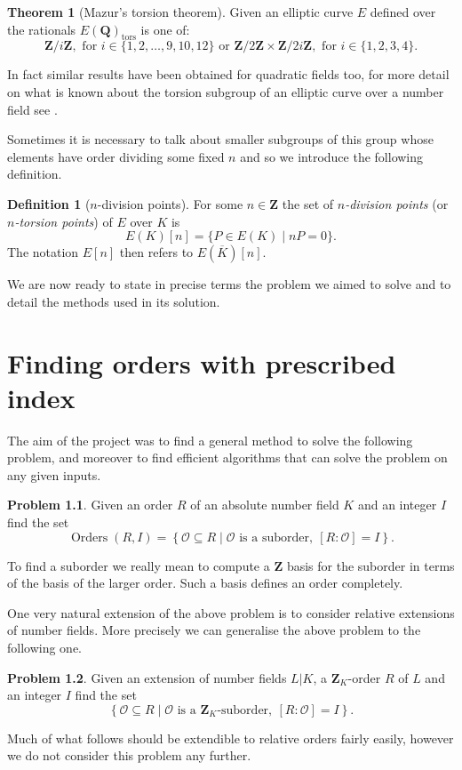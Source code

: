 \documentclass[12pt,a4paper,abstracton,bibtotoc]{scrreprt}
\theoremstyle{definition}
\newtheorem{thm}{Theorem}
\newtheorem{defn}{Definition}
\newtheorem{prob}{Problem}
\newcommand{\QQ}{\mathbf{Q}}
\newcommand{\ZZ}{\mathbf{Z}}
\renewcommand{\O}{\mathcal{O}}
\DeclareMathOperator{\Orders}{Orders}
\begin{document}
\begin{thm}[Mazur's torsion theorem]
\label{thm:tors}
Given an elliptic curve $E$ defined over the rationals $E(\QQ)_\text{tors}$ is one of:
\[
\ZZ/i\ZZ,\text{ for } i \in\{1,2,\ldots,9,10,12\}\text{ or }
\ZZ/2\ZZ \times \ZZ/2i\ZZ,\text{ for } i \in\{1,2,3,4\}.
\]
\end{thm}

In fact similar results have been obtained for quadratic fields too, for more detail on what is known about the torsion subgroup of an elliptic curve over a number field see \cite{sutherland}.

Sometimes it is necessary to talk about smaller subgroups of this group whose elements have order dividing some fixed $n$ and so we introduce the following definition.
\begin{defn}[$n$-division points]
For some $n\in\ZZ$ the set of \emph{$n$-division points} (or \emph{$n$-torsion points}) of $E$ over $K$ is
\[
E(K)[n] = \{P\in E(K) \mid nP = 0\}.
\]
The notation $E[n]$ then refers to $E(\overline{K})[n]$.
\end{defn}

\minisec{}
We are now ready to state in precise terms the problem we aimed to solve and to detail the methods used in its solution.


\chapter{Finding orders with prescribed index}
\label{chap:prob}

The aim of the project was to find a general method to solve the following problem, and moreover to find efficient algorithms that can solve the problem on any given inputs.

\begin{prob}
Given an order $R$ of an absolute number field $K$ and an integer $I$ find the set
\[
\Orders(R,I) = \left\{ \O\subseteq R \mid \O\text{ is a suborder},\ [R:\O] = I\right\}.
\]
\end{prob}

To find a suborder we really mean to compute a $\ZZ$ basis for the suborder in terms of the basis of the larger order.
Such a basis defines an order completely.

\minisec{}
One very natural extension of the above problem is to consider relative extensions of number fields.
More precisely we can generalise the above problem to the following one.

\begin{prob}
\label{prob:rel}
Given an extension of number fields $L|K$, a $\ZZ_K$-order $R$ of $L$ and an integer $I$ find the set
\[
\left\{ \O\subseteq R \mid \O\text{ is a $\ZZ_K$-suborder},\ [R:\O] = I\right\}.
\]
\end{prob}
Much of what follows should be extendible to relative orders fairly easily, however we do not consider this problem any further.
\end{document}
